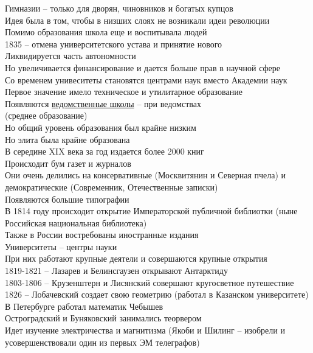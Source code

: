 \documentclass[12pt]{article}
\begin{document}
Гимназии -- только для дворян, чиновников и богатых купцов\\
Идея была в том, чтобы в низших слоях не возникали идеи революции\\
Помимо образования школа еще и воспитывала людей\\
1835 -- отмена университетского устава и принятие нового\\
Ликвидируется часть автономности\\
Но увеличивается финансирование и дается больше прав в научной сфере\\
Со временем унивеситеты становятся центрами наук вместо Академии наук\\
Первое значение имело техническое и утилитарное образование\\
Появляются \underline{ведомственные школы} -- при ведомствах\\
(среднее образование)\\
Но общий уровень образования был крайне низким\\
Но элита была крайне образована\\
В середине XIX века за год издается более 2000 книг\\
Происходит бум газет и журналов\\
Они очень делились на консервативные (Москвитянин и Северная пчела) и демократические (Современник, Отечественные записки)\\
Появляются большие типографии\\
В 1814 году происходит открытие Императорской публичной библиотки (ныне Российская национальная библиотека)\\
Также в России востребованы иностранные издания\\
Университеты -- центры науки\\
При них работают крупные деятели и совершаются крупные открытия\\
1819-1821 -- Лазарев и Белинсгаузен открывают Антарктиду\\
1803-1806 -- Крузенштерн и Лисянский совершают кругосветное путешествие\\
1826 -- Лобачевский создает свою геометрию (работал в Казанском университете)\\
В Петербурге работал математик Чебышев\\
Остроградский и Буняковский занимались теорвером\\
Идет изучение электричества и магнитизма (Якоби и Шилинг -- изобрели и усовершенствовали один из первых ЭМ телеграфов)\\
\end{document}
